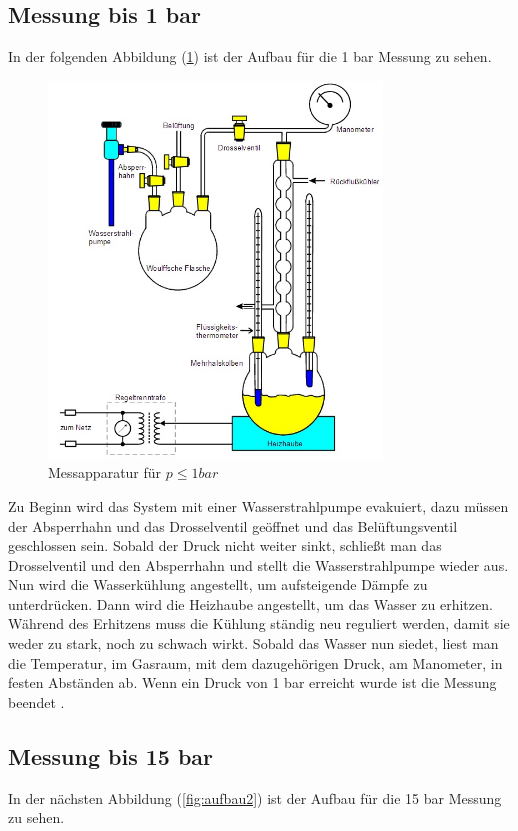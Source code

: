 \subsection{Messung bis 1 bar}
In der folgenden Abbildung (\ref{fig:aufbau1}) ist der Aufbau für die 1 bar Messung
zu sehen.

\begin{figure}
  \centering
  \includegraphics[height=10cm]{Aufbau1.jpg}
  \caption{Messapparatur für $p ≤ 1 bar$}
  \label{fig:aufbau1}
\end{figure}

Zu Beginn wird das System mit einer Wasserstrahlpumpe evakuiert, dazu müssen der
Absperrhahn und das Drosselventil geöffnet und das Belüftungsventil geschlossen sein.
Sobald der Druck nicht weiter sinkt, schließt man das Drosselventil und den
Absperrhahn und stellt die Wasserstrahlpumpe wieder aus. Nun wird die Wasserkühlung
angestellt, um aufsteigende Dämpfe zu unterdrücken. Dann wird die Heizhaube angestellt,
um das Wasser zu erhitzen. Während des Erhitzens muss die Kühlung ständig neu
reguliert werden, damit sie weder zu stark, noch zu schwach wirkt.
Sobald das Wasser nun siedet, liest man die Temperatur, im Gasraum,
mit dem dazugehörigen Druck, am Manometer, in festen Abständen ab.
Wenn ein Druck von 1 bar erreicht wurde ist die Messung beendet \cite{TU}.

\subsection{Messung bis 15 bar}
In der nächsten Abbildung (\ref{fig:aufbau2}) ist der Aufbau für die 15 bar Messung
zu sehen.

